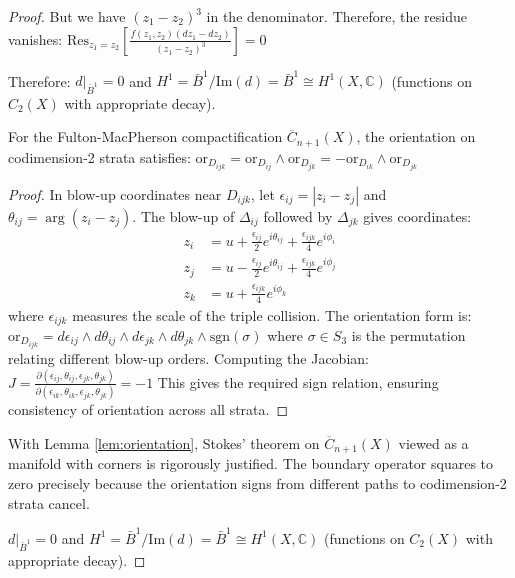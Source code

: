 \begin{proof}
But we have $(z_1 - z_2)^3$ in the denominator. Therefore, the residue vanishes:
$\text{Res}_{z_1=z_2}\left[\frac{f(z_1, z_2)(dz_1 - dz_2)}{(z_1 - z_2)^3}\right] = 0$

Therefore:
$d|_{\bar{B}^1} = 0$
and $H^1 = \bar{B}^1/\text{Im}(d) = \bar{B}^1 \cong H^1(X, \mathbb{C})$ (functions on $C_2(X)$ with appropriate decay).

\begin{lemma}\label{lem:orientation}
For the Fulton-MacPherson compactification $\overline{C}_{n+1}(X)$, the orientation on codimension-2 strata satisfies:
$\text{or}_{D_{ijk}} = \text{or}_{D_{ij}} \wedge \text{or}_{D_{jk}} = -\text{or}_{D_{ik}} \wedge \text{or}_{D_{jk}}$
\end{lemma}

\begin{proof}
In blow-up coordinates near $D_{ijk}$, let $\epsilon_{ij} = |z_i - z_j|$ and $\theta_{ij} = \arg(z_i - z_j)$. The blow-up of $\Delta_{ij}$ followed by $\Delta_{jk}$ gives coordinates:
\begin{align}
z_i &= u + \frac{\epsilon_{ij}}{2}e^{i\theta_{ij}} + \frac{\epsilon_{ijk}}{4}e^{i\phi_i}\\
z_j &= u - \frac{\epsilon_{ij}}{2}e^{i\theta_{ij}} + \frac{\epsilon_{ijk}}{4}e^{i\phi_j}\\
z_k &= u + \frac{\epsilon_{ijk}}{4}e^{i\phi_k}
\end{align}
where $\epsilon_{ijk}$ measures the scale of the triple collision. The orientation form is:
$\text{or}_{D_{ijk}} = d\epsilon_{ij} \wedge d\theta_{ij} \wedge d\epsilon_{jk} \wedge d\theta_{jk} \wedge \text{sgn}(\sigma)$
where $\sigma \in S_3$ is the permutation relating different blow-up orders. Computing the Jacobian:
$J = \frac{\partial(\epsilon_{ij}, \theta_{ij}, \epsilon_{jk}, \theta_{jk})}{\partial(\epsilon_{ik}, \theta_{ik}, \epsilon_{jk}, \theta_{jk})} = -1$
This gives the required sign relation, ensuring consistency of orientation across all strata.
\end{proof}

\begin{remark}
With Lemma \ref{lem:orientation}, Stokes' theorem on $\overline{C}_{n+1}(X)$ viewed as a manifold with corners is rigorously justified. The boundary operator squares to zero precisely because the orientation signs from different paths to codimension-2 strata cancel.
\end{remark}

$d|_{\bar{B}^1} = 0$
and $H^1 = \bar{B}^1/\text{Im}(d) = \bar{B}^1 \cong H^1(X, \mathbb{C})$ (functions on $C_2(X)$ with appropriate decay).
 

\end{proof}
